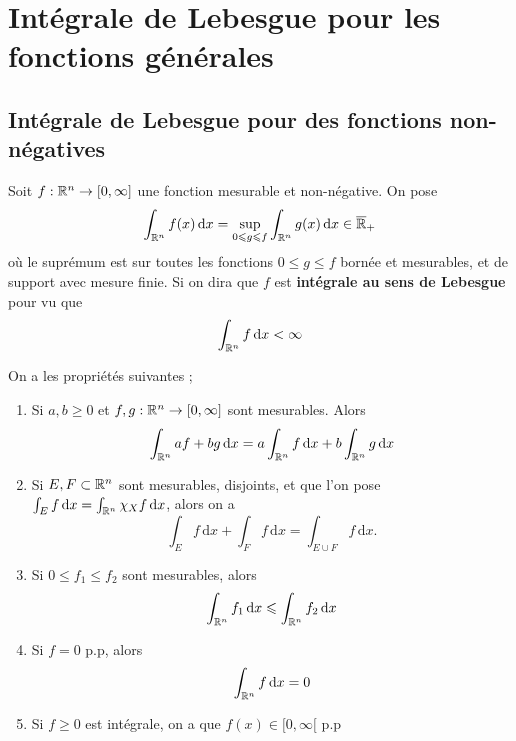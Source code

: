 \section{Intégrale de Lebesgue pour les fonctions générales}

\subsection{Intégrale de Lebesgue pour des fonctions non-négatives}
\begin{definition}
	Soit $f : \mathbb{R}^n \to [0, \infty]$ une fonction mesurable et non-négative. On pose
	\[
	\int_{\mathbb{R}^n} f(x)  \, \mathrm dx = \sup_{0 \leqslant g \leqslant f}\int_{\mathbb{R}^n} g(x) \, \mathrm dx \in \overline {\mathbb{R}}_+
	\]
	où le suprémum est sur toutes les fonctions $0 \leqslant g \leqslant f$ bornée et mesurables, et de support avec mesure finie. Si on dira que $f$ est \textbf{intégrale au sens de Lebesgue} pour vu que
	\[
	\int_{\mathbb{R}^n} f \, \mathrm dx < \infty
	\]
\end{definition}

\begin{proposition} \label{prop: propriétés de l'intégrale de Lebesgue pour des fonctions non-négative}
	On a les propriétés suivantes ; 
	\begin{enumerate}
		\item Si $a, b \geqslant 0$ et $f,g : \mathbb{R}^n \to [0, \infty]$ sont mesurables. Alors
		\[
		\int_{\mathbb{R}^n} a f + b g \, \mathrm dx = a \int_{\mathbb{R}^n} f \, \mathrm dx + b \int_{\mathbb{R}^n} g \, \mathrm dx
		\]
		\item  Si $E, F \subset \mathbb{R}^n$ sont mesurables, disjoints, et que l'on pose $\int_E f \, \mathrm dx = \int_{\mathbb{R}^n} \chi_X f \, \mathrm dx$, alors on a
		\[
		\int_E f \, \mathrm dx + \int_F f \, \mathrm dx = \int_{E \cup F} f \, \mathrm dx.
		\]
		\item Si $0 \leqslant f_1 \leqslant f_2$ sont mesurables, alors
		\[
		\int_{\mathbb{R}^n} f_1 \, \mathrm dx \leqslant \int_{\mathbb{R}^n} f_2 \, \mathrm dx
		\]
		\item Si $f= 0$ p.p, alors
		\[
		\int_{\mathbb{R}^n} f \, \mathrm dx = 0
		\]
		\item Si $f \geqslant 0$ est intégrale, on a que $f(x) \in [0,\infty[$ p.p
	\end{enumerate}
\end{proposition}

